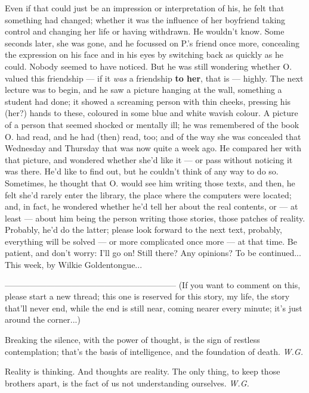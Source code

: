 Even if that could just be an impression or interpretation of his, he felt that something had changed; whether it was the influence of her boyfriend taking control and changing her life or having withdrawn. He wouldn't know. 
Some seconds later, she was gone, and he focussed on P.'s friend once more, concealing the expression on his face and in his eyes by switching back as quickly as he could. 
Nobody seemed to have noticed. 
But he was still wondering whether O. valued this friendship --- if it \emph{was} a friendship \textbf{to her}, that is --- highly. 
The next lecture was to begin, and he saw a picture hanging at the wall, something a student had done; it showed a screaming person with thin cheeks, pressing his (her?) hands to these, coloured in some blue and white wavish colour. A picture of a person that seemed shocked or mentally ill; he was remembered of the book O. had read, and he had (then) read, too; and of the way she was concealed that Wednesday and Thursday that was now quite a week ago. He compared her with that picture, and wondered whether she'd like it --- or pass without noticing it was there. 
He'd like to find out, but he couldn't think of any way to do so. 
Sometimes, he thought that O. would see him writing those texts, and then, he felt she'd rarely enter the library, the place where the computers were located; and, in fact, he wondered whether he'd tell her about the real contents, or --- at least --- about him being the person writing those stories, those patches of reality. 
Probably, he'd do the latter; please look forward to the next text, probably, everything will be solved --- or more complicated once more --- at that time. 
Be patient, and don't worry: I'll go on!
Still there? Any opinions?
To be continued...
This week, by Wilkie Goldentongue...

--------------------------------------------------------------
(If you want to comment on this, please start a new thread; this one is reserved for this story, my life, the story that'll never end, while the end is still near, coming nearer every minute; it's just around the corner...)

Breaking the silence, 
with the power of thought, 
is the sign of restless 
contemplation; 
that's the basis 
of intelligence, 
and the foundation 
of death. 
\emph{W.G.}

Reality 
is thinking. 
And thoughts 
are reality. 
The only thing, 
to keep those brothers 
apart, 
is the fact 
of us not understanding 
ourselves. 
\emph{W.G.}

